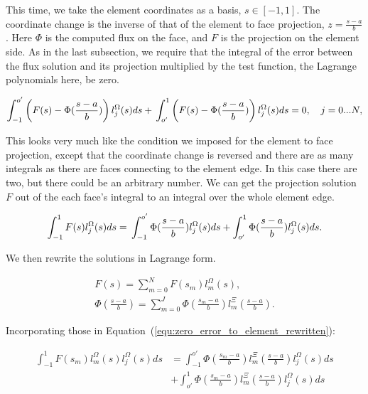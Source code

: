 This time, we take the element coordinates as a basis, $s \in [-1, 1]$. The coordinate change is the
inverse of that of the element to face projection, $z = \frac{s - a}{b}$. Here $\Phi$ is the
computed flux on the face, and $F$ is the projection on the element side. As in the last subsection,
we require that the integral of the error between the flux solution and its projection multiplied by
the test function, the Lagrange polynomials here, be zero.

\begin{equation} \label{equ:zero_error_to_element}
	\int_{-1}^{o'}\left ( F(s) - \Phi (\frac{s - a}{b}) \right ) l_j^\Omega(s)ds + \\
	\int_{o'}^{1} \left ( F(s) - \Phi (\frac{s - a}{b}) \right )l_j^\Omega (s)ds = 0, \\
	\quad j = 0...N,
\end{equation}

This looks very much like the condition we imposed for the element to face projection, except that
the coordinate change is reversed and there are as many integrals as there are faces connecting to
the element edge. In this case there are two, but there could be an arbitrary number. We can get the
projection solution $F$ out of the each face's integral to an integral over the whole element edge.

\begin{equation} \label{equ:zero_error_to_element_rewritten}
	\int_{-1}^{1}F(s)l_j^\Omega(s)ds = \\
	\int_{-1}^{o'} \Phi (\frac{s -a}{b}) l_j^\Omega(s)ds + 
	\int_{o'}^{1} \Phi(\frac{s-a}{b})l_j^\Omega(s)ds.
\end{equation}

We then rewrite the solutions in Lagrange form.

\begin{gather}
	F(s) = \sum_{m = 0}^{N}F(s_m)l_m^\Omega(s), \\
	\Phi(\frac{s -a}{b}) = \sum_{m = 0}^{J}\Phi(\frac{s_m -a}{b})l_m^\Xi(\frac{s -a}{b}).
\end{gather}

Incorporating those in Equation~(\ref{equ:zero_error_to_element_rewritten}):

\begin{equation} 
	\begin{aligned}
		\int_{-1}^{1}F(s_m)l_m^\Omega(s) l_j^\Omega(s)ds &= \int_{-1}^{o'} \Phi(\frac{s_m -a}{b})l_m^\Xi(\frac{s -a}{b}) l_j^\Omega(s)ds \\
		&+ \int_{o'}^{1} \Phi(\frac{s_m -a}{b})l_m^\Xi(\frac{s -a}{b}) l_j^\Omega(s)ds
	\end{aligned}
\end{equation}

